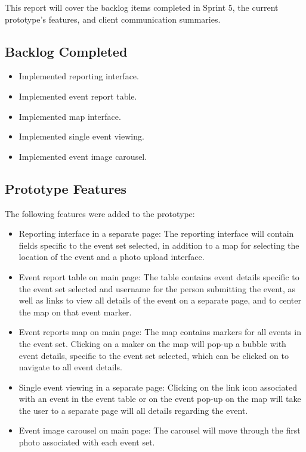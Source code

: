 
This report will cover the backlog items completed in Sprint 5, the current prototype's features, and client communication summaries. 

 \subsection{Backlog Completed}
\begin{itemize}
\item Implemented reporting interface. 
\item Implemented event report table. 
\item Implemented map interface.
\item Implemented single event viewing.  
\item Implemented event image carousel.
\end{itemize}
 
\subsection{Prototype Features}
The following features were added to the prototype:
\begin{itemize}
\item Reporting interface in a separate page: The reporting interface will contain fields specific to the event set selected, in addition to a map for selecting the location of the event and a photo upload interface.
\item Event report table on main page: The table contains event details specific to the event set selected and username for the person submitting the event, as well as links to view all details of the event on a separate page, and to center the map on that event marker. 
\item Event reports map on main page: The map contains markers for all events in the event set. Clicking on a maker on the map will pop-up a bubble with event details, specific to the event set selected, which can be clicked on to navigate to all event details.
\item Single event viewing in a separate page: Clicking on the link icon associated with an event in the event table or on the event pop-up on the map will take the user to a separate page will all details regarding the event.
\item Event image carousel on main page: The carousel will move through the first photo associated with each event set.
\end{itemize}

